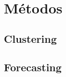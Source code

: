 \section{Métodos}
\label{sec:methods}














\subsection{Clustering}
\label{sec:methods:subsec:clustering}







\subsection{Forecasting}
\label{sec:methods:subsec:forecasting}

